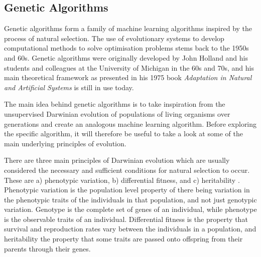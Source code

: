 \documentclass[multicolumn, 9pt]{extarticle}
\begin{document}
\subsection{Genetic Algorithms}
Genetic algorithms form a family of machine learning algorithms inspired by the process of natural selection. The use of evolutionary systems to develop computational methods to solve optimisation problems stems back to the 1950s and 60s. Genetic algorithms were originally developed by John Holland and his students and colleagues at the University of Michigan in the 60s and 70s, and his main theoretical framework as presented in his 1975 book \textit{Adaptation in Natural and Artificial Systems} \cite{Holland} is still in use today.

The main idea behind genetic algorithms is to take inspiration from the unsupervised Darwinian evolution of populations of living organisms over generations and create an analogous machine learning algorithm. Before exploring the specific algorithm, it will therefore be useful to take a look at some of the main underlying principles of evolution.

There are three main principles of Darwinian evolution which are usually considered the necessary and sufficient conditions for natural selection to occur. These are a) phenotypic variation, b) differential fitness, and c) heritability \cite{Eyal}. Phenotypic variation is the population level property of there being variation in the phenotypic traits of the individuals in that population, and not just genotypic variation. Genotype is the complete set of genes of an individual, while phenotype is the observable traits of an individual. Differential fitness is the property that survival and reproduction rates vary between the individuals in a population, and heritability the property that some traits are passed onto offspring from their parents through their genes.
\end{document}
